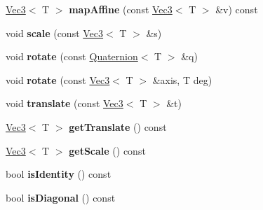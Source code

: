 \begin{DoxyCompactItemize}
\item 
\hypertarget{classps_1_1base_1_1Matrix_aae66820fe910cc66909281fa025e5edd}{}\hyperlink{classps_1_1base_1_1Vec3}{Vec3}$<$ T $>$ {\bfseries map\+Affine} (const \hyperlink{classps_1_1base_1_1Vec3}{Vec3}$<$ T $>$ \&v) const \label{classps_1_1base_1_1Matrix_aae66820fe910cc66909281fa025e5edd}

\item 
\hypertarget{classps_1_1base_1_1Matrix_a67137ccb80a12abae957ce1204704c28}{}void {\bfseries scale} (const \hyperlink{classps_1_1base_1_1Vec3}{Vec3}$<$ T $>$ \&s)\label{classps_1_1base_1_1Matrix_a67137ccb80a12abae957ce1204704c28}

\item 
\hypertarget{classps_1_1base_1_1Matrix_ab4c1c9b53cc0dfebbeaec5f185c3b8c9}{}void {\bfseries rotate} (const \hyperlink{classps_1_1base_1_1Quaternion}{Quaternion}$<$ T $>$ \&q)\label{classps_1_1base_1_1Matrix_ab4c1c9b53cc0dfebbeaec5f185c3b8c9}

\item 
\hypertarget{classps_1_1base_1_1Matrix_a18bfa444eb5e322d14f0a7925a619f6e}{}void {\bfseries rotate} (const \hyperlink{classps_1_1base_1_1Vec3}{Vec3}$<$ T $>$ \&axis, T deg)\label{classps_1_1base_1_1Matrix_a18bfa444eb5e322d14f0a7925a619f6e}

\item 
\hypertarget{classps_1_1base_1_1Matrix_ab59280e4665dcd646558f7fc222dc835}{}void {\bfseries translate} (const \hyperlink{classps_1_1base_1_1Vec3}{Vec3}$<$ T $>$ \&t)\label{classps_1_1base_1_1Matrix_ab59280e4665dcd646558f7fc222dc835}

\item 
\hypertarget{classps_1_1base_1_1Matrix_a8aa0e129bdeba6707120d13f8424691f}{}\hyperlink{classps_1_1base_1_1Vec3}{Vec3}$<$ T $>$ {\bfseries get\+Translate} () const \label{classps_1_1base_1_1Matrix_a8aa0e129bdeba6707120d13f8424691f}

\item 
\hypertarget{classps_1_1base_1_1Matrix_ad0da62e11d66e0da09faf116609855bf}{}\hyperlink{classps_1_1base_1_1Vec3}{Vec3}$<$ T $>$ {\bfseries get\+Scale} () const \label{classps_1_1base_1_1Matrix_ad0da62e11d66e0da09faf116609855bf}

\item 
\hypertarget{classps_1_1base_1_1Matrix_a1e864ca4a64dc29252af0bee83d3e952}{}bool {\bfseries is\+Identity} () const \label{classps_1_1base_1_1Matrix_a1e864ca4a64dc29252af0bee83d3e952}

\item 
\hypertarget{classps_1_1base_1_1Matrix_af269142683e1e26429b7262971ff2679}{}bool {\bfseries is\+Diagonal} () const \label{classps_1_1base_1_1Matrix_af269142683e1e26429b7262971ff2679}


\end{DoxyCompactItemize}
